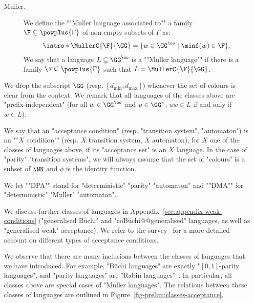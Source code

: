 \documentclass{theoretics}
\begin{document}
\begin{description}
	\item[Muller.] \AP We define the ""Muller language associated to"" a family $\F\subseteq \powplus{\Gamma}$ of non-empty subsets of $\Gamma$ as:
	\[ \intro*\MullerC{\F}{\GG} = \{w\in \GG^\oo \mid \minf(w) \in \F\}. \]
	\AP We say that a language $L\subseteq \GG^\oo$ is a ""Muller language"" if there is a family $\F\subseteq \powplus{\Gamma}$ such that $L = \MullerC{\F}{\GG}$. %
\end{description}


We drop the subscript $\GG$ (resp. $[d_{\min}, d_{\max}]$) whenever the set of colours is clear from the context. 
We remark that all languages of the classes above are "prefix-independent" (for all $w\in \GG^\oo$ and $u\in \GG^*$,  $uw\in L$ if and only if $w\in L$).


\AP We say that an "acceptance condition" (resp. "transition system", "automaton") is an ""$X$ condition"" (resp. $X$ transition system, $X$ automaton), for $X$ one of the classes of languages above, if its "acceptance set" is an $X$ language. 
In the case of "parity" "transition systems", we will always assume that the set of "colours" is a subset of $\NN$ and $\phi$ is the identity function.

\AP We let ""DPA"" stand for "deterministic" "parity" "automaton" and ""DMA"" for "deterministic" "Muller" "automaton".



We discuss further classes of languages in Appendix~\ref{sec:appendix-weak-conditions} ("generalised B\"uchi" and "coB\"uchi@@generalised" languages, as well as "generalised weak" acceptance). We refer to the survey~\cite{Boker18WhyTypes} for a more detailed account on different types of acceptance conditions.

\begin{remark}
	We observe that there are many inclusions between the classes of languages that we have introduced. For example, "Büchi languages" are exactly "$[0,1]$-parity languages", and "parity languages" are "Rabin languages"~\cite{Mostowski1984RegularEF}. 
	In particular, all  classes above are special cases of "Muller languages".
	The relations between these classes of languages are outlined in Figure~\ref{fig-prelim:classes-acceptance}. 
\end{remark}
\end{document}
